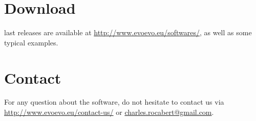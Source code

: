 \section{Download}
{\packageName} last releases are available at \href{http://www.evoevo.eu/softwares/}{http://www.evoevo.eu/softwares/}, as well as some typical examples.

\section{Contact}
For any question about the software, do not hesitate to contact us via \href{http://www.evoevo.eu/contact-us/}{http://www.evoevo.eu/contact-us/} or \href{charles.rocabert@gmail.com}{charles.rocabert@gmail.com}.
